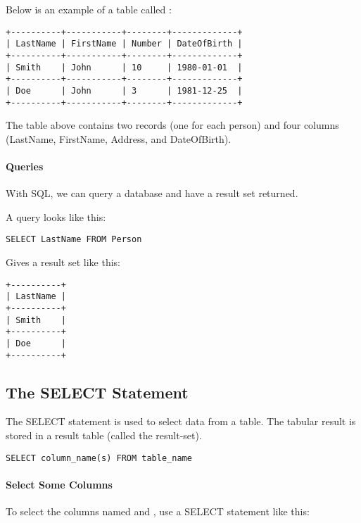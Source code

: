 \documentclass{howto}
\begin{document}
Below is an example of a table called :
\begin{verbatim}
+----------+-----------+--------+-------------+
| LastName | FirstName | Number | DateOfBirth |
+----------+-----------+--------+-------------+
| Smith    | John      | 10     | 1980-01-01  |
+----------+-----------+--------+-------------+
| Doe      | John      | 3      | 1981-12-25  |
+----------+-----------+--------+-------------+
\end{verbatim}

The table above contains two records (one for each person) and four columns (LastName, FirstName, Address, and DateOfBirth).

\paragraph{Queries}

With SQL, we can query a database and have a result set returned.

A query looks like this:

\begin{verbatim}
SELECT LastName FROM Person
\end{verbatim}

Gives a result set like this:
\begin{verbatim}
+----------+
| LastName |
+----------+
| Smith    |
+----------+
| Doe      |
+----------+
\end{verbatim}


\subsection{The SELECT Statement}

The SELECT statement is used to select data from a table. The tabular result is stored in a result table (called the result-set).

\begin{verbatim}
SELECT column_name(s) FROM table_name
\end{verbatim}

\paragraph{Select Some Columns}

To select the columns named  and , use a SELECT statement like this:
\end{document}

